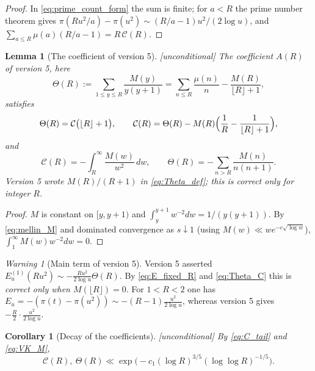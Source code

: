 \documentclass[11pt]{amsart}
\numberwithin{equation}{section}
\theoremstyle{plain}
\newtheorem{lemma}[theorem]{Lemma}
\newtheorem{corollary}[theorem]{Corollary}
\theoremstyle{definition}
\theoremstyle{remark}
\newtheorem{warning}[theorem]{Warning}
\newcommand{\Cc}{\mathcal{C}}
\begin{document}
\begin{proof}
In \eqref{eq:prime_count_form} the sum is finite; for $a<R$ the prime number
theorem gives $\pi(Ru^2/a)-\pi(u^2)\sim(R/a-1)u^2/(2\log u)$, and
$\sum_{a\le R}\mu(a)(R/a-1)=R\,\Cc(R)$.
\end{proof}

\begin{lemma}[The coefficient of version 5]
\label{lem:copy-weight-coefficient}
\emph{[unconditional]} The coefficient $A(R)$ of version 5, here
\begin{equation}
\label{eq:Theta_def}
  \Theta(R):=\sum_{1\le y\le R}\frac{M(y)}{y(y+1)}
  =\sum_{n\le R}\frac{\mu(n)}n-\frac{M(R)}{\lfloor R\rfloor+1},
\end{equation}
satisfies
\begin{equation}
\label{eq:Theta_C}
  \Theta(R)=\Cc\bigl(\lfloor R\rfloor+1\bigr),\qquad
  \Cc(R)=\Theta(R)-M(R)\Bigl(\frac1R-\frac1{\lfloor R\rfloor+1}\Bigr),
\end{equation}
and
\begin{equation}
\label{eq:C_tail}
  \Cc(R)=-\int_R^\infty\frac{M(w)}{w^2}\,dw,\qquad
  \Theta(R)=-\sum_{n>R}\frac{M(n)}{n(n+1)}.
\end{equation}
Version 5 wrote $M(R)/(R+1)$ in \eqref{eq:Theta_def}; this is correct only
for integer $R$.
\end{lemma}

\begin{proof}
$M$ is constant on $[y,y+1)$ and $\int_y^{y+1}w^{-2}dw=1/(y(y+1))$. By
\eqref{eq:mellin_M} and dominated convergence as $s\downarrow1$ (using
$M(w)\ll we^{-c\sqrt{\log w}}$), $\int_1^\infty M(w)w^{-2}dw=0$.
\end{proof}

\begin{warning}[Main term of version 5]
\label{warn:v5_main_term}
Version 5 asserted $E_u^{(1)}(Ru^2)\sim-\frac{Ru^2}{2\log u}\Theta(R)$. By
\eqref{eq:E_fixed_R} and \eqref{eq:Theta_C} this is \emph{correct only when
$M(\lfloor R\rfloor)=0$}. For $1<R<2$ one has
$E_u=-(\pi(t)-\pi(u^2))\sim-(R-1)\frac{u^2}{2\log u}$, whereas version 5
gives $-\frac R2\cdot\frac{u^2}{2\log u}$.
\end{warning}

\begin{corollary}[Decay of the coefficients]
\label{cor:AR-VK}
\emph{[unconditional]} By \eqref{eq:C_tail} and \eqref{eq:VK_M},
\begin{equation}
\label{eq:AR-VK}
  \Cc(R),\ \Theta(R)\ll\exp\bigl(-c_1(\log R)^{3/5}(\log\log R)^{-1/5}\bigr).
\end{equation}
\end{corollary}
\end{document}
